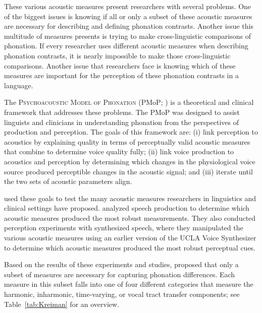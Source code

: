 \documentclass[12pt, letterpaper]{article}
\begin{document}
These various acoustic measures present researchers with several problems. One of the biggest issues is knowing if all or only a subset of these acoustic measures are necessary for describing and defining phonation contrasts. Another issue this multitude of measures presents is trying to make cross-linguistic comparisons of phonation. If every researcher uses different acoustic measures when describing phonation contrasts, it is nearly impossible to make those cross-linguistic comparisons. Another issue that researchers face is knowing which of these measures are important for the perception of these phonation contrasts in a language. 

The \textsc{Psychoacoustic Model of Phonation} (PMoP; \cite{kreimanUnifiedTheoryVoice2014}) is a theoretical and clinical framework that addresses these problems. The PMoP was designed to assist linguists and clinicians in understanding phonation from the perspectives of production and perception. The goals of this framework are: (i) link perception to acoustics by explaining quality in terms of perceptually valid acoustic measures that combine to determine voice quality fully; (ii) link voice production to acoustics and perception by determining which changes in the physiological voice source produced perceptible changes in the acoustic signal; and (iii) iterate until the two sets of acoustic parameters align. 

\citeauthor{kreimanUnifiedTheoryVoice2014} used these goals to test the many acoustic measures researchers in linguistics and clinical settings have proposed. \citeauthor{kreimanUnifiedTheoryVoice2014} analyzed speech production to determine which acoustic measures produced the most robust measurements. They also conducted perception experiments with synthesized speech, where they manipulated the various acoustic measures using an earlier version of the UCLA Voice Synthesizer \citep{kreimanUCLAVoiceSynthesizer2016} to determine which acoustic measures produced the most robust perceptual cues. 

Based on the results of these experiments and studies, \citeauthor{kreimanUnifiedTheoryVoice2014} proposed that only a subset of measures are necessary for capturing phonation differences. Each measure in this subset falls into one of four different categories that measure the harmonic, inharmonic, time-varying, or vocal tract transfer components; see Table~\ref{tab:Kreiman} for an overview. 
\end{document}
